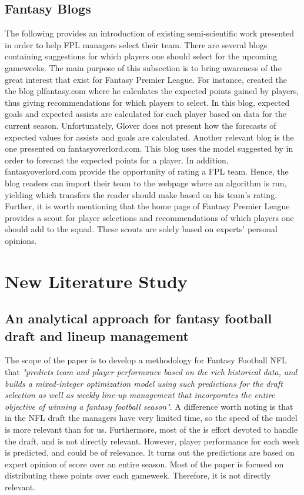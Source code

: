 \subsection{Fantasy Blogs} \label{Fantasy_Blogs} 
The following provides an introduction of existing semi-scientific work presented in order to help FPL managers select their team. There are several blogs containing suggestions for which players one should select for the upcoming gameweeks. The main purpose of this subsection is to bring awareness of the great interest that exist for Fantasy Premier League. 
\newpar
For instance, \cite{Glover} created the the blog plfantasy.com where he calculates the expected points gained by players, thus giving recommendations for which players to select. In this blog, expected goals and expected assists are calculated for each player based on data for the current season. Unfortunately, Glover does not present how the forecasts of expected values for assists and goals are calculated.
\newpar
Another relevant blog is the one presented on fantasyoverlord.com. This blog uses the model suggested by \citep{Matthews} in order to forecast the expected points for a player. In addition, fantasyoverlord.com provide the opportunity of rating a FPL team. Hence, the blog readers can import their team to the webpage where an algorithm is run, yielding which transfers the reader should make based on his team's rating. 
\newpar
Further, it is worth mentioning that the home page of Fantasy Premier League provides a scout for player selections and recommendations of which players one should add to the squad. These scouts are solely based on experts' personal opinions.

\section{New Literature Study} \label{new} 

\subsection{An analytical approach for fantasy football draft
and lineup management}
The scope of the paper is to develop a methodology for Fantasy Football NFL that \textit{"predicts team and player performance based on the rich historical data, and builds a mixed-integer optimization model using such predictions for the draft selection as well as weekly line-up management that incorporates the entire objective of winning a fantasy football season"}. A difference worth noting is that in the NFL draft the managers have very limited time, so the speed of the model is more relevant than for us. Furthermore, most of the is effort devoted to handle the draft, and is not directly relevant. However, player performance for each week is predicted, and could be of relevance. It turns out the predictions are based on expert opinion of score over an entire season. Most of the paper is focused on distributing these points over each gameweek. Therefore, it is not directly relevant. 
\newpar

